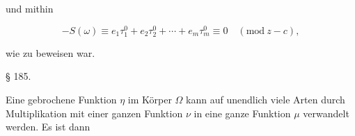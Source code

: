 und mithin

\[ -S(\omega) \equiv e_1\tau_1^0 + e_2\tau_2^0 + \cdots + e_m\tau_m^0 \equiv 0 \quad (\mathrm{mod}\ z-c), \]

wie zu beweisen war.

\begin{center}
§ 185. \textbf{}
\end{center}

Eine gebrochene Funktion $\eta$ im Körper $\Omega$ kann auf
unendlich viele Arten durch Multiplikation mit einer ganzen Funktion
$\nu$ in eine ganze Funktion $\mu$ verwandelt werden. Es ist dann
